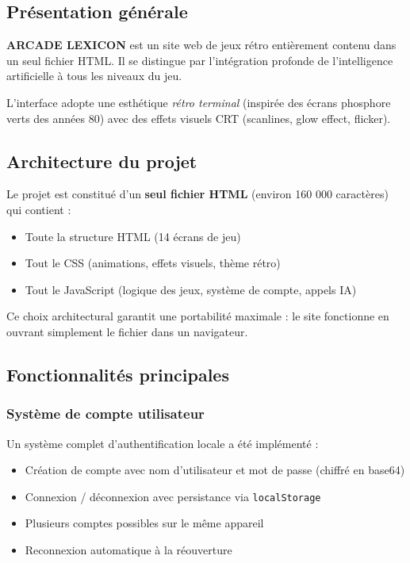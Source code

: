 \documentclass[a4paper, 12pt, twoside]{article}
\begin{document}
\subsection{Présentation générale}

\textbf{ARCADE LEXICON} est un site web de jeux rétro entièrement contenu dans un seul fichier HTML. Il se distingue par l'intégration profonde de l'intelligence artificielle à tous les niveaux du jeu.

L'interface adopte une esthétique \textit{rétro terminal} (inspirée des écrans phosphore verts des années 80) avec des effets visuels CRT (scanlines, glow effect, flicker).

\subsection{Architecture du projet}

Le projet est constitué d'un \textbf{seul fichier HTML} (environ 160 000 caractères) qui contient :

\begin{itemize}
  \item Toute la structure HTML (14 écrans de jeu)
  \item Tout le CSS (animations, effets visuels, thème rétro)
  \item Tout le JavaScript (logique des jeux, système de compte, appels IA)
\end{itemize}

Ce choix architectural garantit une portabilité maximale : le site fonctionne en ouvrant simplement le fichier dans un navigateur.

\subsection{Fonctionnalités principales}

\subsubsection{Système de compte utilisateur}

Un système complet d'authentification locale a été implémenté :
\begin{itemize}
  \item Création de compte avec nom d'utilisateur et mot de passe (chiffré en base64)
  \item Connexion / déconnexion avec persistance via \texttt{localStorage}
  \item Plusieurs comptes possibles sur le même appareil
  \item Reconnexion automatique à la réouverture
\end{itemize}
\end{document}

